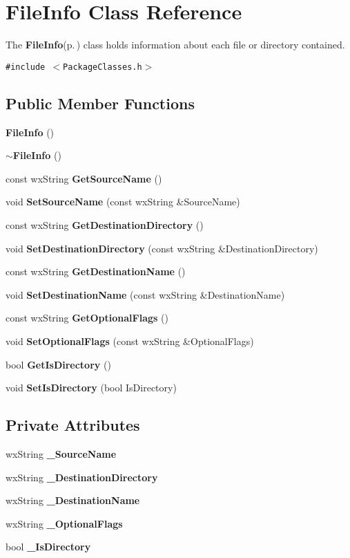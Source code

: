 \section{File\-Info Class Reference}
\label{class_file_info}
The {\bf File\-Info}{\rm (p.\,\pageref{class_file_info})} class holds information about each file or directory contained.  


{\tt \#include $<$Package\-Classes.h$>$}

\subsection*{Public Member Functions}
\begin{CompactItemize}
\item 
{\bf File\-Info} ()
\item 
{\bf $\sim$File\-Info} ()
\item 
const wx\-String {\bf Get\-Source\-Name} ()
\item 
void {\bf Set\-Source\-Name} (const wx\-String \&Source\-Name)
\item 
const wx\-String {\bf Get\-Destination\-Directory} ()
\item 
void {\bf Set\-Destination\-Directory} (const wx\-String \&Destination\-Directory)
\item 
const wx\-String {\bf Get\-Destination\-Name} ()
\item 
void {\bf Set\-Destination\-Name} (const wx\-String \&Destination\-Name)
\item 
const wx\-String {\bf Get\-Optional\-Flags} ()
\item 
void {\bf Set\-Optional\-Flags} (const wx\-String \&Optional\-Flags)
\item 
bool {\bf Get\-Is\-Directory} ()
\item 
void {\bf Set\-Is\-Directory} (bool Is\-Directory)
\end{CompactItemize}
\subsection*{Private Attributes}
\begin{CompactItemize}
\item 
wx\-String {\bf \_\-Source\-Name}
\item 
wx\-String {\bf \_\-Destination\-Directory}
\item 
wx\-String {\bf \_\-Destination\-Name}
\item 
wx\-String {\bf \_\-Optional\-Flags}
\item 
bool {\bf \_\-Is\-Directory}
\end{CompactItemize}


